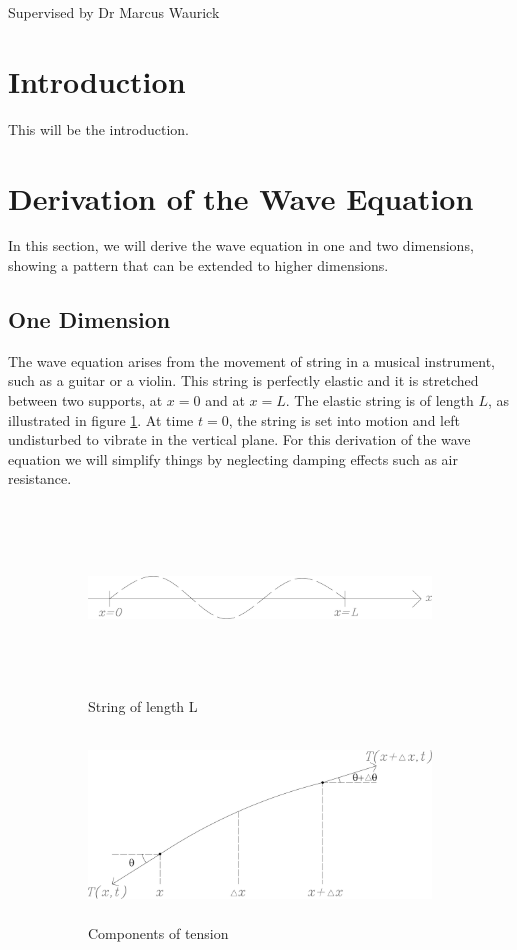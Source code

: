 \documentclass[12pt]{article}
\numberwithin{equation}{section}
\begin{document}
    \vspace*{5cm}
    Supervised by Dr Marcus Waurick
    \newpage
    \normalsize
    \tableofcontents
    \newpage
    
    \section{Introduction}
    This will be the introduction.
    
    \section{Derivation of the Wave Equation}
    In this section, we will derive the wave equation in one and two dimensions, showing a pattern that 
can be extended to higher dimensions.

\subsection{One Dimension}
The wave equation arises from the movement of string in a musical instrument, such as a guitar or a violin.
\cite{BoyDiP} This string is perfectly elastic and
it is stretched between two supports, at $x=0$ and at $x=L$. The elastic string is of length $L$, as
illustrated in figure \ref{fig:1a}. At time $t=0$, the string is set into motion and left undisturbed to vibrate in the
vertical plane. For this derivation of the wave equation we will simplify things by neglecting damping 
effects such as air resistance.

\begin{figure}[h]
    \begin{subfigure}{0.5\textwidth}
    \includegraphics[width=0.9\linewidth, height=5cm]{images/grafic-1} 
    \caption{String of length L}
    \label{fig:1a}
    \end{subfigure}
    \begin{subfigure}{0.5\textwidth}
    \includegraphics[width=0.9\linewidth, height=5cm]{images/grafic-2}
    \caption{Components of tension}
    \label{fig:1b}
    \end{subfigure}     
\caption{}
\label{fig:1}
\end{figure}
\end{document}
